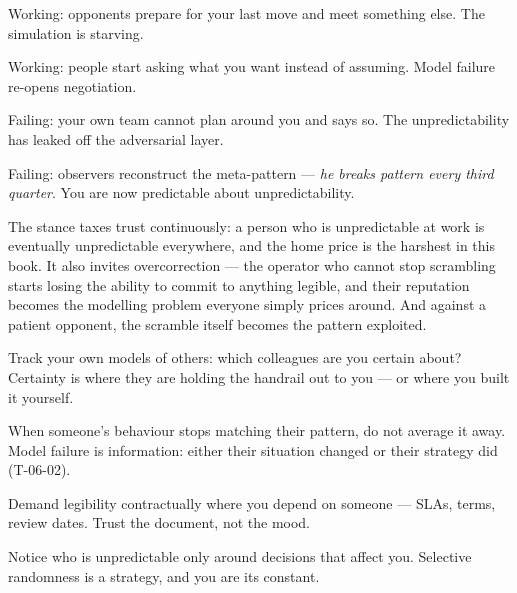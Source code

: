 \begin{feedback}
  \item Working: opponents prepare for your last move and meet something else. The simulation is starving.
  \item Working: people start asking what you want instead of assuming. Model failure re-opens negotiation.
  \item Failing: your own team cannot plan around you and says so. The unpredictability has leaked off the adversarial layer.
  \item Failing: observers reconstruct the meta-pattern --- \emph{he breaks pattern every third quarter}. You are now predictable about unpredictability.
\end{feedback}
\begin{failure}
The stance taxes trust continuously: a person who is unpredictable at work is eventually unpredictable everywhere, and the home price is the harshest in this book. It also invites overcorrection --- the operator who cannot stop scrambling starts losing the ability to commit to anything legible, and their reputation becomes the modelling problem everyone simply prices around. And against a patient opponent, the scramble itself becomes the pattern exploited.
\end{failure}
\begin{countermeasures}
  \item Track your own models of others: which colleagues are you certain about? Certainty is where they are holding the handrail out to you --- or where you built it yourself.
  \item When someone's behaviour stops matching their pattern, do not average it away. Model failure is information: either their situation changed or their strategy did (T-06-02).
  \item Demand legibility contractually where you depend on someone --- SLAs, terms, review dates. Trust the document, not the mood.
  \item Notice who is unpredictable only around decisions that affect you. Selective randomness is a strategy, and you are its constant.
\end{countermeasures}

\seesources
{}
